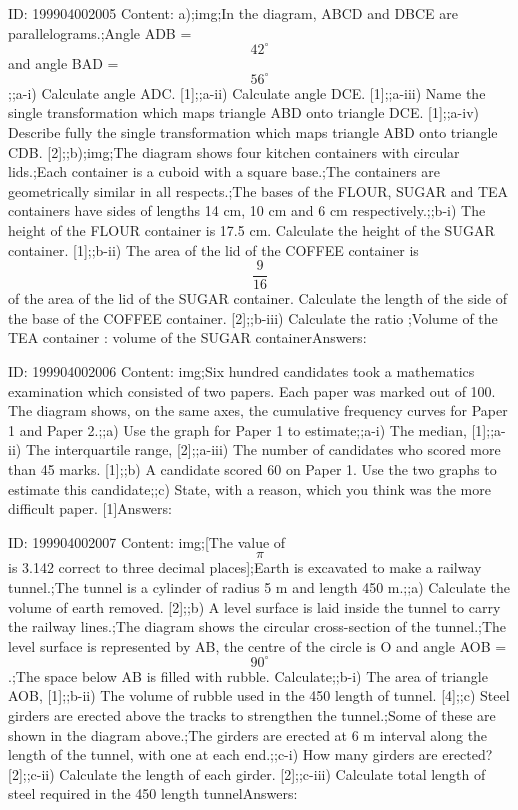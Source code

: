 \documentclass{article}
\begin{document}
ID: 199904002005
Content:
a);img;In the diagram, ABCD and DBCE are parallelograms.;Angle ADB = $$42^{\circ}$$ and angle BAD = $$56^{\circ}$$;;a-i) Calculate angle ADC. [1];;a-ii) Calculate angle DCE. [1];;a-iii) Name the single transformation which maps triangle ABD onto triangle DCE. [1];;a-iv) Describe fully the single transformation which maps triangle ABD onto triangle CDB. [2];;b);img;The diagram shows four kitchen containers with circular lids.;Each container is a cuboid with a square base.;The containers are geometrically similar in all respects.;The bases of the FLOUR, SUGAR and TEA containers have sides of lengths 14 cm, 10 cm and 6 cm respectively.;;b-i) The height of the FLOUR container is 17.5 cm. Calculate the height of the SUGAR container. [1];;b-ii) The area of the lid of the COFFEE container is $$\frac{9}{16}$$ of the area of the lid of the SUGAR container. Calculate the length of the side of the base of the COFFEE container. [2];;b-iii) Calculate the ratio ;Volume of the TEA container : volume of the SUGAR containerAnswers:

ID: 199904002006
Content:
img;Six hundred candidates took a mathematics examination which consisted of two papers. Each paper was marked out of 100. The diagram shows, on the same axes, the cumulative frequency curves for Paper 1 and Paper 2.;;a) Use the graph for Paper 1 to estimate;;a-i) The median, [1];;a-ii) The interquartile range, [2];;a-iii) The number of candidates who scored more than 45 marks. [1];;b) A candidate scored 60 on Paper 1. Use the two graphs to estimate this candidate;;c) State, with a reason, which you think was the more difficult paper. [1]Answers:

ID: 199904002007
Content:
img;[The value of $$\pi$$ is 3.142 correct to three decimal places];Earth is excavated to make a railway tunnel.;The tunnel is a cylinder of radius 5 m and length 450 m.;;a) Calculate the volume of earth removed. [2];;b) A level surface is laid inside the tunnel to carry the railway lines.;The diagram shows the circular cross-section of the tunnel.;The level surface is represented by AB, the centre of the circle is O and angle AOB = $$90^{\circ}$$.;The space below AB is filled with rubble. Calculate;;b-i) The area of triangle AOB, [1];;b-ii) The volume of rubble used in the 450 length of tunnel. [4];;c) Steel girders are erected above the tracks to strengthen the tunnel.;Some of these are shown in the diagram above.;The girders are erected at 6 m interval along the length of the tunnel, with one at each end.;;c-i) How many girders are erected? [2];;c-ii) Calculate the length of each girder. [2];;c-iii) Calculate total length of steel required in the 450 length tunnelAnswers:
\end{document}
